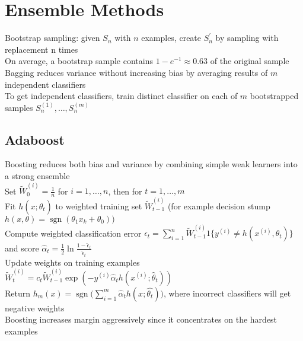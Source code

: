 \documentclass{article}
\DeclareMathOperator{\sgn}{sgn}
\begin{document}
\section{Ensemble Methods}
Bootstrap sampling: given $S_n$ with $n$ examples, create $S_n^\prime$ by sampling with replacement n times \\
On average, a bootstrap sample contains $1-e^{-1} \approx 0.63$ of the original sample \\
Bagging reduces variance without increasing bias by averaging results of $m$ independent classifiers \\
To get independent classifiers, train distinct classifier on each of $m$ bootstrapped samples $S^{(1)}_n, \ldots, S^{(m)}_n$ 

\subsection{Adaboost}
Boosting reduces both bias and variance by combining simple weak learners into a strong ensemble \\
Set $\widetilde{W}_0^{(i)} = \frac{1}{n}$ for $i = 1, \ldots, n$, then for $t = 1, \ldots, m$ \\
Fit $h(x; \hat{\theta}_t)$ to weighted training set $\widetilde{W}_{t-1}^{(i)}$  (for example decision stump $h(x, \theta) = \sgn(\theta_1 x_k + \theta_0))$ \\
Compute weighted classification error $\hat{\epsilon}_t = \sum_{i=1}^n \widetilde{W}_{t-1}^{(i)} 1\{y^{(i)} \neq h(x^{(i)}, \hat{\theta}_t )\}$ and score $\hat{\alpha}_t = \frac{1}{2}\ln {\frac{1 - \hat{\epsilon}_t}{\hat{\epsilon}_t}}$ \\
Update weights on training examples $\widetilde{W}_t^{(i)} = c_t\widetilde{W}_{t-1}^{(i)} \exp(-y^{(i)} \hat{\alpha}_t h(x^{(i)}; \hat{\theta}_t))$ \\
Return $h_m(x) = \sgn\big(\sum\limits_{i=1}^m \hat{\alpha}_t h(x; \hat{\theta_t})\big)$, where incorrect classifiers will get negative weights \\
Boosting increases margin aggressively since it concentrates on the hardest examples
\end{document}
